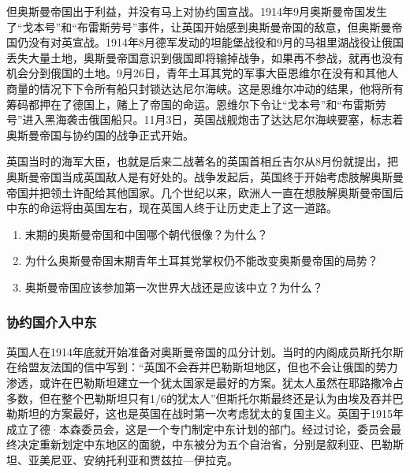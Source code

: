 \documentclass{article}
\begin{document}
但奥斯曼帝国出于利益，并没有马上对协约国宣战。1914年9月奥斯曼帝国发生了“戈本号”和“布雷斯劳号”事件，让英国开始感到奥斯曼帝国的敌意，但奥斯曼帝国仍没有对英宣战。1914年8月德军发动的坦能堡战役和9月的马祖里湖战役让俄国丢失大量土地，奥斯曼帝国意识到俄国即将输掉战争，如果再不参战，就再也没有机会分到俄国的土地。9月26日，青年土耳其党的军事大臣恩维尔在没有和其他人商量的情况下下令所有船只封锁达达尼尔海峡。这是恩维尔冲动的结果，他将所有筹码都押在了德国上，赌上了帝国的命运。恩维尔下令让“戈本号”和“布雷斯劳号”进入黑海袭击俄国船只。11月3日，英国战舰炮击了达达尼尔海峡要塞，标志着奥斯曼帝国与协约国的战争正式开始。


英国当时的海军大臣，也就是后来二战著名的英国首相丘吉尔从8月份就提出，把奥斯曼帝国当成英国敌人是有好处的。战争发起后，英国终于开始考虑肢解奥斯曼帝国并把领土许配给其他国家。几个世纪以来，欧洲人一直在想肢解奥斯曼帝国后中东的命运将由英国左右，现在英国人终于让历史走上了这一道路。\\
\begin{enumerate}
    \small
    \item 末期的奥斯曼帝国和中国哪个朝代很像？为什么？
    \item 为什么奥斯曼帝国末期青年土耳其党掌权仍不能改变奥斯曼帝国的局势？
    \item 奥斯曼帝国应该参加第一次世界大战还是应该中立？为什么？
\end{enumerate}
\subsubsection{协约国介入中东}
\normalsize
\selectfont
英国人在1914年底就开始准备对奥斯曼帝国的瓜分计划。当时的内阁成员斯托尔斯在给盟友法国的信中写到：“英国不会吞并巴勒斯坦地区，但也不会让俄国的势力渗透，或许在巴勒斯坦建立一个犹太国家是最好的方案。犹太人虽然在耶路撒冷占多数，但在整个巴勒斯坦只有1/6的犹太人”但斯托尔斯最终还是认为由埃及吞并巴勒斯坦的方案最好，这也是英国在战时第一次考虑犹太的复国主义。英国于1915年成立了德·本森委员会，这是一个专门制定中东计划的部门。经过讨论，委员会最终决定重新划定中东地区的面貌，中东被分为五个自治省，分别是叙利亚、巴勒斯坦、亚美尼亚、安纳托利亚和贾兹拉—伊拉克。
\end{document}
